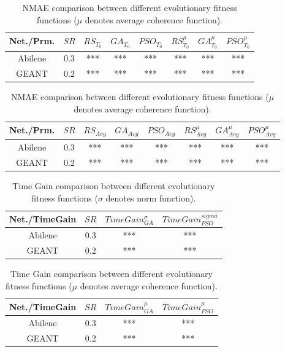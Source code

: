 \begin{table}[b]
	\centering
 \footnotesize{
 \renewcommand{\tabcolsep}{0.05cm}
 \renewcommand{\arraystretch}{1.0}
		\begin{tabular}{| c | c | c | c | c | c | c | c |}
		\hline
       Net./Prm. & $SR$ & $RS_{T_{0}}$ & $GA_{T_{0}}$ & $PSO_{T_{0}}$ & $RS^{\mu}_{T_{0}}$ & $GA^{\mu}_{T_{0}}$ & $PSO^{\mu}_{T_{0}}$  \\ \hline
      Abilene    & 0.3 & *** & *** & *** & *** & *** & *** \\ \hline
      GEANT      & 0.2 & *** & *** & *** & *** & *** & *** \\ \hline
    \end{tabular}
    \newline
\vspace*{0.15cm}
\newline
		\begin{tabular}{| c | c | c | c | c | c | c | c |}
		\hline
       Net./Prm. & $SR$ & $RS_{Avg}$ & $GA_{Avg}$ & $PSO_{Avg}$ & $RS^{\mu}_{Avg}$ & $GA^{\mu}_{Avg}$ & $PSO^{\mu}_{Avg}$  \\ \hline
      Abilene    & 0.3 & *** & *** & *** & *** & *** & ***  \\ \hline
      GEANT      & 0.2 & *** & *** & *** & *** & *** & ***  \\ \hline
    \end{tabular}
	\caption{\scriptsize{NMAE comparison between different evolutionary fitness functions ($\mu$ denotes average coherence function).}}
	\label{tab:FitFuncCmp1}
}
\end{table}


\begin{table}[b]
	\centering
 \footnotesize{
 \renewcommand{\tabcolsep}{0.05cm}
 \renewcommand{\arraystretch}{1.0}
		\begin{tabular}{| c | c | c | c |}
		\hline
       Net./TimeGain & $SR$ & $Time Gain^{\sigma}_{GA}$ & $Time Gain^{sigma}_{PSO}$ \\ \hline
      Abilene    & 0.3 & *** & ***  \\ \hline
      GEANT      & 0.2 & *** & ***  \\ \hline
    \end{tabular}
	\caption{\scriptsize{Time Gain comparison between different evolutionary fitness functions ($\sigma$ denotes norm function).}}
	\label{tab:FitFuncCmp2}
}
\end{table}


\begin{table}[b]
	\centering
 \footnotesize{
 \renewcommand{\tabcolsep}{0.05cm}
 \renewcommand{\arraystretch}{1.0}
		\begin{tabular}{| c | c | c | c |}
		\hline
       Net./TimeGain & $SR$ & $Time Gain^{\mu}_{GA}$ & $Time Gain^{\mu}_{PSO}$ \\ \hline
      Abilene    & 0.3 & *** & ***  \\ \hline
      GEANT      & 0.2 & *** & ***  \\ \hline
    \end{tabular}
	\caption{\scriptsize{Time Gain comparison between different evolutionary fitness functions ($\mu$ denotes average coherence function).}}
	\label{tab:FitFuncCmp2}
}
\end{table}

